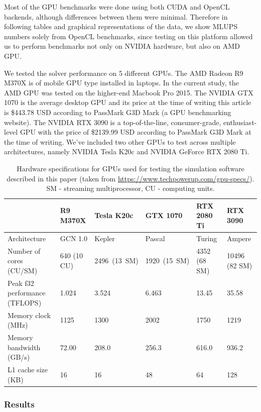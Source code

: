 Most of the GPU benchmarks were done using both CUDA and OpenCL backends, although differences between them were minimal. Therefore in following tables and graphical representations of the data, we show MLUPS numbers solely from OpenCL benchmarks, since testing on this platform allowed us to perform benchmarks not only on NVIDIA hardware, but also on AMD GPU.

We tested the solver performance on 5 different GPUs. The AMD Radeon R9 M370X is of mobile GPU type installed in laptops. In the current study, the AMD GPU was tested on the higher-end Macbook Pro 2015. The NVIDIA GTX 1070 is the average desktop GPU and its price at the time of writing this article is \$443.78 USD according to PassMark G3D Mark (a GPU benchmarking website). The NVIDIA RTX 3090 is a top-of-the-line, consumer-grade, enthusiast-level GPU with the price of \$2139.99 USD according to PassMark G3D Mark at the time of writing. We've included two other GPUs to test across multiple architectures, namely NVIDIA Tesla K20c and NVIDIA GeForce RTX 2080 Ti.

\begin{table}[!ht]
	\centering
	\begin{tabular}{ |p{4.9cm}||p{2cm}|p{2cm}|p{2cm}|p{2.1cm}|p{2.2cm}| }
		\hline
		& R9 M370X & Tesla K20c & GTX 1070 & RTX 2080 Ti & RTX 3090 \\
		\hline
		Architecture   & GCN 1.0 & Kepler & Pascal  & Turing &  Ampere  \\
		Number of cores (CU/SM)   & 640 (10 CU) & 2496~(13~SM) & 1920~(15~SM)   &  4352 (68 SM) &  10496 (82 SM) \\
		Peak f32 performance (TFLOPS)   & 1.024  & 3.524 & 6.463  & 13.45 &  35.58 \\
		Memory clock (MHz)   & 1125  & 1300 & 2002   & 1750 &   1219 \\
		Memory bandwidth (GB/s)   & 72.00  & 208.0  & 256.3   & 616.0 &   936.2 \\
		L1 cache size (KB)   & 16  & 16  & 48   & 64 &   128 \\
		\hline
	\end{tabular}
	\caption{Hardware specifications for GPUs used for testing the simulation software described in this paper (taken from \url{https://www.techpowerup.com/gpu-specs/}). SM - streaming multiprocessor, CU - computing units.}
	\label{tab:gpus}
\end{table}

\subsubsection{Results}

